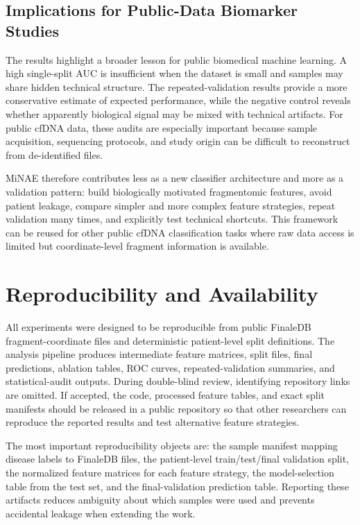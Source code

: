 \documentclass[conference]{IEEEtran}
\begin{document}
\subsection{Implications for Public-Data Biomarker Studies}
The results highlight a broader lesson for public biomedical machine learning. A high single-split AUC is insufficient when the dataset is small and samples may share hidden technical structure. The repeated-validation results provide a more conservative estimate of expected performance, while the negative control reveals whether apparently biological signal may be mixed with technical artifacts. For public cfDNA data, these audits are especially important because sample acquisition, sequencing protocols, and study origin can be difficult to reconstruct from de-identified files.

MiNAE therefore contributes less as a new classifier architecture and more as a validation pattern: build biologically motivated fragmentomic features, avoid patient leakage, compare simpler and more complex feature strategies, repeat validation many times, and explicitly test technical shortcuts. This framework can be reused for other public cfDNA classification tasks where raw data access is limited but coordinate-level fragment information is available.

\section{Reproducibility and Availability}
All experiments were designed to be reproducible from public FinaleDB fragment-coordinate files and deterministic patient-level split definitions. The analysis pipeline produces intermediate feature matrices, split files, final predictions, ablation tables, ROC curves, repeated-validation summaries, and statistical-audit outputs. During double-blind review, identifying repository links are omitted. If accepted, the code, processed feature tables, and exact split manifests should be released in a public repository so that other researchers can reproduce the reported results and test alternative feature strategies.

The most important reproducibility objects are: the sample manifest mapping disease labels to FinaleDB files, the patient-level train/test/final validation split, the normalized feature matrices for each feature strategy, the model-selection table from the test set, and the final-validation prediction table. Reporting these artifacts reduces ambiguity about which samples were used and prevents accidental leakage when extending the work.
\end{document}
